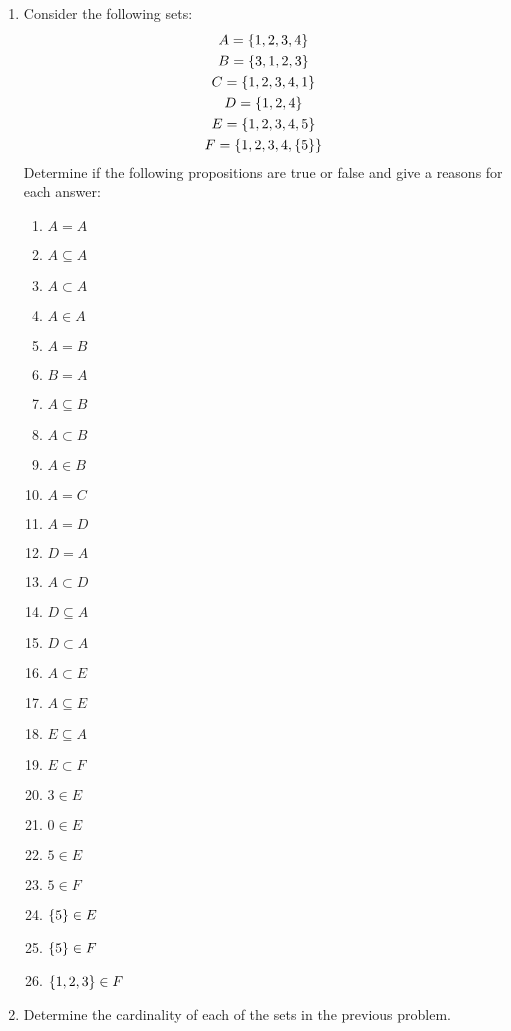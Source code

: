 \documentclass[letterpaper,12pt,fleqn]{article}
\begin{document}
\begin{enumerate}[left=0in,itemsep=0.5in]
\item Consider the following sets:
  \begin{gather*}
    A=\{1,2,3,4\} \\
    B=\{3,1,2,3\} \\
    C=\{1,2,3,4,1\} \\
    D=\{1,2,4\} \\
    E=\{1,2,3,4,5\} \\
    F=\{1,2,3,4,\{5\}\} \\
  \end{gather*}
  Determine if the following propositions are true or false and give a reasons for each answer:
  \begin{enumerate}
  \item \(A=A\)
  \item \(A\subseteq A\)
  \item \(A\subset A\)
  \item \(A\in A\)
  \item \(A=B\)
  \item \(B=A\)
  \item \(A\subseteq B\)
  \item \(A\subset B\)
  \item \(A\in B\)
  \item \(A=C\)
  \item \(A=D\)
  \item \(D=A\)
  \item \(A\subset D\)
  \item \(D\subseteq A\)
  \item \(D\subset A\)
  \item \(A\subset E\)
  \item \(A\subseteq E\)
  \item \(E\subseteq A\)
  \item \(E\subset F\)
  \item \(3\in E\)
  \item \(0\in E\)
  \item \(5\in E\)
  \item \(5\in F\)
  \item \(\{5\}\in E\)
  \item \(\{5\}\in F\)
  \item \(\{1,2,3\}\in F\)
  \end{enumerate}

\item Determine the cardinality of each of the sets in the previous problem.


\end{enumerate}
\end{document}
